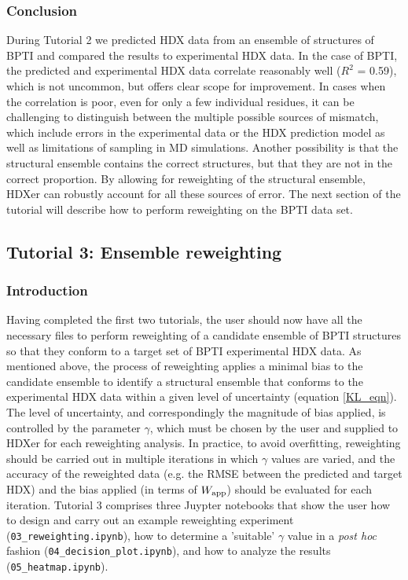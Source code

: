 \documentclass[9pt,tutorial]{livecoms}
\begin{document}
\subsubsection{Conclusion}

During Tutorial 2 we predicted HDX data from an ensemble of structures of BPTI and compared the results to experimental HDX data. 
In the case of BPTI, the predicted and experimental HDX data correlate reasonably well ($R^2$ = 0.59), which is not uncommon, but offers clear scope for improvement.
In cases when the correlation is poor, even for only a few individual residues, it can be challenging to distinguish between the multiple possible sources of mismatch, which include errors in the experimental data or the HDX prediction model as well as limitations of sampling in MD simulations. 
Another possibility is that the structural ensemble contains the correct structures, but that they are not in the correct proportion. 
By allowing for reweighting of the structural ensemble, HDXer can robustly account for all these sources of error. 
The next section of the tutorial will describe how to perform reweighting on the BPTI data set. 

\subsection{Tutorial 3: Ensemble reweighting}\label{tutorial_3}

\subsubsection{Introduction}

Having completed the first two tutorials, the user should now have all the necessary files to perform reweighting of a candidate ensemble of BPTI structures so that they conform to a target set of BPTI experimental HDX data.
As mentioned above, the process of reweighting applies a minimal bias to the candidate ensemble to identify a structural ensemble that conforms to the experimental HDX data within a given level of uncertainty (equation \ref{KL_eqn}).
The level of uncertainty, and correspondingly the magnitude of bias applied, is controlled by the parameter $\gamma$, which must be chosen by the user and supplied to HDXer for each reweighting analysis.
In practice, to avoid overfitting, reweighting should be carried out in multiple iterations in which $\gamma$ values are varied, and the accuracy of the reweighted data (e.g. the RMSE between the predicted and target HDX) and the bias applied (in terms of $W_\textnormal{app}$) should be evaluated for each iteration.
Tutorial 3 comprises three Juypter notebooks that show the user how to design and carry out an example reweighting experiment (\texttt{03\_reweighting.ipynb}), how to determine a 'suitable' $\gamma$ value in a \textit{post hoc} fashion (\texttt{04\_decision\_plot.ipynb}), and how to analyze the results (\texttt{05\_heatmap.ipynb}). 
\end{document}
